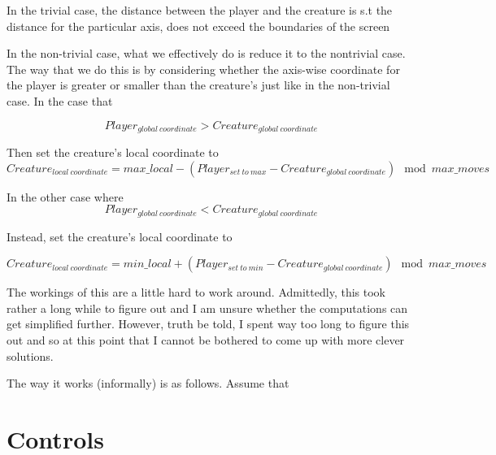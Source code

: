 \documentclass{report}
\begin{document}
In the trivial case, the distance between the player and the creature is s.t the distance for the particular axis, does not exceed the boundaries of the screen \newline

In the non-trivial case, what we effectively do is reduce it to the nontrivial case. The way that we do this is by considering whether the axis-wise coordinate for the player is greater or smaller than the creature's just like in the non-trivial case. In the case that

\[ Player_{global  \:coordinate} > Creature_{global \: coordinate} \]

Then set the creature's local coordinate to
\[ Creature_{local \: coordinate} = max\_local - (Player_{set \: to \: max} - Creature_{global \: coordinate} ) \mod  max\_moves  \]


In the other case where 
\[ Player_{global  \:coordinate} < Creature_{global \: coordinate} \]

Instead, set the creature's local coordinate to

\[ Creature_{local \: coordinate} = min\_local + (Player_{set \: to \: min} - Creature_{global \: coordinate} ) \mod  max\_moves  \]

The workings of this are a little hard to work around. Admittedly, this took rather a long while to figure out and I am unsure whether the computations can get simplified further. However, truth be told, I spent way too long to figure this out and so at this point that I cannot be bothered to come up with more clever solutions. \newline

The way it works (informally) is as follows. Assume that



\section*{Controls}
\end{document}

